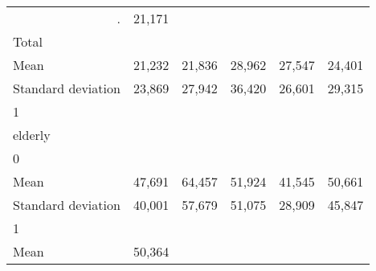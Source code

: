 \begin{tabular}{llllll}
  \multicolumn{1}{r}{.} &
  \multicolumn{1}{r}{21,171} \\
\multicolumn{1}{l}{\hspace{3em}Total} &
  \multicolumn{1}{|r}{} &
  \multicolumn{1}{r}{} &
  \multicolumn{1}{r}{} &
  \multicolumn{1}{r}{} &
  \multicolumn{1}{r}{} \\
\multicolumn{1}{l}{\hspace{4em}Mean} &
  \multicolumn{1}{|r}{21,232} &
  \multicolumn{1}{r}{21,836} &
  \multicolumn{1}{r}{28,962} &
  \multicolumn{1}{r}{27,547} &
  \multicolumn{1}{r}{24,401} \\
\multicolumn{1}{l}{\hspace{4em}Standard deviation} &
  \multicolumn{1}{|r}{23,869} &
  \multicolumn{1}{r}{27,942} &
  \multicolumn{1}{r}{36,420} &
  \multicolumn{1}{r}{26,601} &
  \multicolumn{1}{r}{29,315} \\
\multicolumn{1}{l}{\hspace{1em}1} &
  \multicolumn{1}{|r}{} &
  \multicolumn{1}{r}{} &
  \multicolumn{1}{r}{} &
  \multicolumn{1}{r}{} &
  \multicolumn{1}{r}{} \\
\multicolumn{1}{l}{\hspace{2em}elderly} &
  \multicolumn{1}{|r}{} &
  \multicolumn{1}{r}{} &
  \multicolumn{1}{r}{} &
  \multicolumn{1}{r}{} &
  \multicolumn{1}{r}{} \\
\multicolumn{1}{l}{\hspace{3em}0} &
  \multicolumn{1}{|r}{} &
  \multicolumn{1}{r}{} &
  \multicolumn{1}{r}{} &
  \multicolumn{1}{r}{} &
  \multicolumn{1}{r}{} \\
\multicolumn{1}{l}{\hspace{4em}Mean} &
  \multicolumn{1}{|r}{47,691} &
  \multicolumn{1}{r}{64,457} &
  \multicolumn{1}{r}{51,924} &
  \multicolumn{1}{r}{41,545} &
  \multicolumn{1}{r}{50,661} \\
\multicolumn{1}{l}{\hspace{4em}Standard deviation} &
  \multicolumn{1}{|r}{40,001} &
  \multicolumn{1}{r}{57,679} &
  \multicolumn{1}{r}{51,075} &
  \multicolumn{1}{r}{28,909} &
  \multicolumn{1}{r}{45,847} \\
\multicolumn{1}{l}{\hspace{3em}1} &
  \multicolumn{1}{|r}{} &
  \multicolumn{1}{r}{} &
  \multicolumn{1}{r}{} &
  \multicolumn{1}{r}{} &
  \multicolumn{1}{r}{} \\
\multicolumn{1}{l}{\hspace{4em}Mean} &
  \multicolumn{1}{|r}{50,364} &
  \multicolumn{1}{r}{} &
  \multicolumn{1}{r}{} &

\end{tabular}
